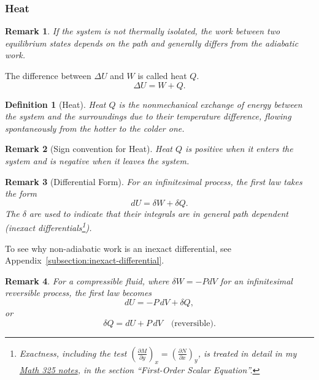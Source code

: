 \documentclass{article}
\newtheorem{definition}{Definition}
\newtheorem{remark}{Remark}
\begin{document}
\subsubsection{Heat}
\begin{remark}
    If the system is not thermally isolated, the work between two equilibrium states depends on the path and generally differs from the adiabatic work.
\end{remark}
The difference between $\Delta U$ and $W$ is called heat $Q$.
\begin{equation}
    \label{eq:first-law-thermo}
    \Delta U = W + Q.
\end{equation}
\begin{definition}[Heat]
    Heat $Q$ is the nonmechanical exchange of energy between the system and the surroundings due to their temperature difference, flowing spontaneously from the hotter to the colder one.
\end{definition}
\begin{remark}[Sign convention for Heat]
    Heat $Q$ is positive when it enters the system and is negative when it leaves the system.
\end{remark}
\begin{remark}[Differential Form]
    For an infinitesimal process, the first law takes the form
    \begin{equation}
        \label{eq:first-law-differential}
        dU = \delta W + \delta Q.
    \end{equation}
    The $\delta$ are used to indicate that their integrals are in general path dependent (inexact differentials\footnote{Exactness, including the test $\left(\frac{\partial M}{\partial y}\right)_x = \left(\frac{\partial N}{\partial x}\right)_y$, is treated in detail in my \href{https://github.com/williamr-yc7/stem-undergrad-notes/blob/86199275ed081fd521621a48faec61bef0cb1069/Winter\%202026/Math325.pdf}{Math 325 notes}, in the section ``First-Order Scalar Equation''.}).
\end{remark}
To see why non-adiabatic work is an inexact differential, see Appendix~\ref{subsection:inexact-differential}.
\begin{remark}
    For a compressible fluid, where $\delta W = -PdV$ for an infinitesimal reversible process, the first law becomes
    \[dU = -P\,dV + \delta Q,\]
    or
    \begin{equation}
        \label{eq:first-law-reversible}
        \delta Q = dU + P\,dV \quad \text{(reversible)}.
    \end{equation}
\end{remark}
\end{document}
